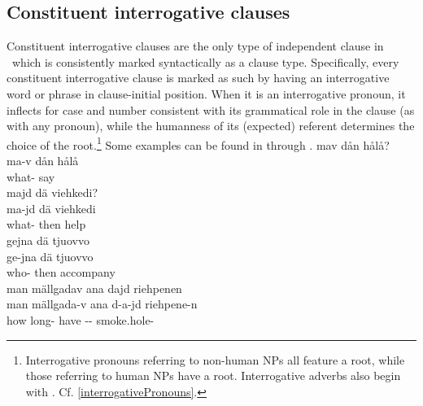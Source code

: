 \subsection{Constituent interrogative clauses}\label{constituentQs}
Constituent interrogative clauses are the only type of independent clause in \PS\ which is consistently marked syntactically as a clause type. Specifically, every constituent interrogative clause is marked as such by having an interrogative word or phrase in clause-initial position. When it is an interrogative pronoun, it inflects for case and number consistent with its grammatical role in the clause (as with any pronoun), while the humanness of its (expected) referent determines the choice of the root.\footnote{Interrogative pronouns referring to non-human NPs all feature a  root, while those referring to human NPs have a  root. Interrogative adverbs also begin with . Cf. \SEC\ref{interrogativePronouns}.} 
Some examples can be found in  through . 
\ea\label{questionWordQ1}%
\glll	mav dån hålå?\\
	ma-v dån hålå\\
	what-  say\BS{}\\\nopagebreak
{} 
\z
\ea\label{questionWordQ2}%
\glll	majd dä viehkedi?\\
	ma-jd dä viehkedi\\
	what- then help\BS{}\\\nopagebreak
{} 
\z
\ea\label{questionWordQ3}%
\glll	gejna dä tjuovvo\\
	ge-jna dä tjuovvo\\
	who- then accompany\BS{}\\\nopagebreak
{} 
\z
\ea\label{questionWordQ4}%
\glll	man mällgadav ana dajd riehpenen\\
	man mällgada-v ana d-a-jd riehpene-n\\
	how long- have\BS{} -- smoke.hole-\\\nopagebreak
{} 
\z

